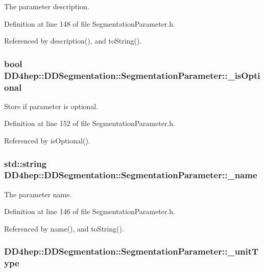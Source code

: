 The parameter description. 

Definition at line 148 of file SegmentationParameter.h.

Referenced by description(), and toString().\hypertarget{class_d_d4hep_1_1_d_d_segmentation_1_1_segmentation_parameter_a0dfb17241c0a1ed7f6a54c13ec6c9adb}{
\subsubsection[{\_\-isOptional}]{\setlength{\rightskip}{0pt plus 5cm}bool {\bf DD4hep::DDSegmentation::SegmentationParameter::\_\-isOptional}}}
\label{class_d_d4hep_1_1_d_d_segmentation_1_1_segmentation_parameter_a0dfb17241c0a1ed7f6a54c13ec6c9adb}


Store if parameter is optional. 

Definition at line 152 of file SegmentationParameter.h.

Referenced by isOptional().\hypertarget{class_d_d4hep_1_1_d_d_segmentation_1_1_segmentation_parameter_a3d95d4b4814b3a5e1f15a432ca6526b1}{
\subsubsection[{\_\-name}]{\setlength{\rightskip}{0pt plus 5cm}std::string {\bf DD4hep::DDSegmentation::SegmentationParameter::\_\-name}}}
\label{class_d_d4hep_1_1_d_d_segmentation_1_1_segmentation_parameter_a3d95d4b4814b3a5e1f15a432ca6526b1}


The parameter name. 

Definition at line 146 of file SegmentationParameter.h.

Referenced by name(), and toString().\hypertarget{class_d_d4hep_1_1_d_d_segmentation_1_1_segmentation_parameter_a1f5990f9669bf3265f6253f1f9a03e2a}{
\subsubsection[{\_\-unitType}]{ {\bf DD4hep::DDSegmentation::SegmentationParameter::\_\-unitType}}}
\label{class_d_d4hep_1_1_d_d_segmentation_1_1_segmentation_parameter_a1f5990f9669bf3265f6253f1f9a03e2a}


